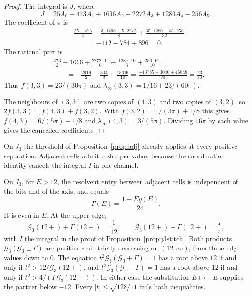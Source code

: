 \begin{proof}
The integral is \(J\), where
\[
J=25A_0-473A_1+1696A_2-2272A_3+1280A_4-256A_5.
\]
The coefficient of \(\pi\) is
\begin{align*}
&\frac{25-473}{4}
+\frac{3\cdot 1696-5\cdot 2272}{8}
+\frac{35\cdot 1280-63\cdot 256}{32}\\
&\qquad=-112-784+896=0.
\end{align*}
The rational part is
\begin{align*}
&\frac{473}{2}-1696+\frac{2272\cdot 11}{6}
-\frac{1280\cdot 10}{3}+\frac{256\cdot 61}{10}\\
&\qquad=-\frac{2919}{2}-\frac{304}{3}+\frac{15616}{10}
=\frac{-43785-3040+46848}{30}
=\frac{23}{30}.
\end{align*}
Thus \(f(3,3)=23/(30\pi)\) and
\(\lambda_\infty(3,3)=1/16+23/(60\pi)\).

The neighbours of \((3,3)\) are two copies of \((4,3)\) and two copies of
\((3,2)\), so \(2f(3,3)=f(4,3)+f(3,2)\).
With \(f(3,2)=1/(3\pi)+1/8\) this gives
\(f(4,3)=6/(5\pi)-1/8\) and \(\lambda_\infty(4,3)=3/(5\pi)\).
Dividing \(16\pi\) by each value gives the cancelled coefficients.
\end{proof}

On \(J_3\) the threshold of Proposition~\ref{prop:adj} already applies at
every positive separation.
Adjacent cells admit a sharper value, because the coordination identity
cancels the integral \(I\) in one channel.

\begin{proposition}
\label{prop:j3nn}
On \(J_3\), for \(E>12\), the resolvent entry between adjacent cells is
independent of the bits and of the axis, and equals
\[
\Gamma(E)=\frac{1-Eg(E)}{24}.
\]
It is even in \(E\).
At the upper edge,
\[
\mathcal{G}_3(12+)+\Gamma(12+)=\frac{1}{12},
\qquad
\mathcal{G}_3(12+)-\Gamma(12+)=\frac{I}{4},
\]
with \(I\) the integral in the proof of Proposition~\ref{prop:j3stitch}.
Both products \(\mathcal{G}_3(\mathcal{G}_3\pm\Gamma)\) are positive and
strictly decreasing on \((12,\infty)\), from these edge values down to \(0\).
The equation \(t^2\mathcal{G}_3(\mathcal{G}_3+\Gamma)=1\) has a root above
\(12\) if and only if
\(t^2>12/\mathcal{G}_3(12+)\),
and \(t^2\mathcal{G}_3(\mathcal{G}_3-\Gamma)=1\) has a root above \(12\) if
and only if
\(t^2>4/(I\,\mathcal{G}_3(12+))\).
In either case the substitution \(E\mapsto -E\) supplies the partner below
\(-12\).
Every \(|t|\le\sqrt{128/11}\) fails both inequalities.
\end{proposition}

